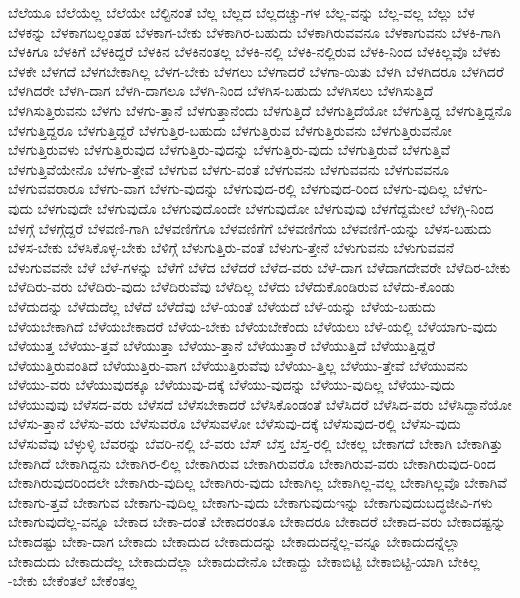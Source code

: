 {ಬೆಲೆಯೂ
ಬೆಲೆಯೆಲ್ಲ
ಬೆಲೆಯೇ
ಬೆಲ್ಟಿನಂತೆ
ಬೆಲ್ಲ
ಬೆಲ್ಲದ
ಬೆಲ್ಲದಚ್ಚು-ಗಳ
ಬೆಲ್ಲ-ವನ್ನು
ಬೆಲ್ಲ-ವಲ್ಲ
ಬೆಲ್ಲು
ಬೆಳ
ಬೆಳಕನ್ನು
ಬೆಳಕಾಗಬಲ್ಲಂತಹ
ಬೆಳಕಾಗ-ಬೇಕು
ಬೆಳಕಾಗಿರ-ಬಹುದು
ಬೆಳಕಾಗಿರುವವನೂ
ಬೆಳಕಾಗುವನು
ಬೆಳಕಿ-ಗಾಗಿ
ಬೆಳಕಿಗೂ
ಬೆಳಕಿಗೆ
ಬೆಳಕಿದ್ದರೆ
ಬೆಳಕಿನ
ಬೆಳಕಿನಂತಲ್ಲ
ಬೆಳಕಿ-ನಲ್ಲಿ
ಬೆಳಕಿ-ನಲ್ಲಿರುವ
ಬೆಳಕಿ-ನಿಂದ
ಬೆಳಕಿಲ್ಲವೊ
ಬೆಳಕು
ಬೆಳಕೇ
ಬೆಳಗದೆ
ಬೆಳಗಬೇಕಾಗಿಲ್ಲ
ಬೆಳಗ-ಬೇಕು
ಬೆಳಗಲು
ಬೆಳಗಾದರೆ
ಬೆಳಗಾ-ಯಿತು
ಬೆಳಗಿ
ಬೆಳಗಿದರೂ
ಬೆಳಗಿದರೆ
ಬೆಳಗಿದರೇ
ಬೆಳಗಿ-ದಾಗ
ಬೆಳಗಿ-ದಾಗಲೂ
ಬೆಳಗಿ-ನಿಂದ
ಬೆಳಗಿಸ-ಬಹುದು
ಬೆಳಗಿಸಲು
ಬೆಳಗಿಸುತ್ತಿದೆ
ಬೆಳಗಿಸುತ್ತಿರುವನು
ಬೆಳಗು
ಬೆಳಗು-ತ್ತಾನೆ
ಬೆಳಗುತ್ತಾನೆಂದು
ಬೆಳಗುತ್ತಿದೆ
ಬೆಳಗುತ್ತಿದೆಯೋ
ಬೆಳಗುತ್ತಿದ್ದ
ಬೆಳಗುತ್ತಿದ್ದನೊ
ಬೆಳಗುತ್ತಿದ್ದರೂ
ಬೆಳಗುತ್ತಿದ್ದರೆ
ಬೆಳಗುತ್ತಿರ-ಬಹುದು
ಬೆಳಗುತ್ತಿರುವ
ಬೆಳಗುತ್ತಿರುವನು
ಬೆಳಗುತ್ತಿರುವನೋ
ಬೆಳಗುತ್ತಿರುವಳು
ಬೆಳಗುತ್ತಿರುವುದ
ಬೆಳಗುತ್ತಿರು-ವುದನ್ನು
ಬೆಳಗುತ್ತಿರು-ವುದು
ಬೆಳಗುತ್ತಿರುವೆ
ಬೆಳಗುತ್ತಿವೆ
ಬೆಳಗುತ್ತಿವೆಯೇನೊ
ಬೆಳಗು-ತ್ತೇವೆ
ಬೆಳಗುವ
ಬೆಳಗು-ವಂತೆ
ಬೆಳಗುವನು
ಬೆಳಗುವವನು
ಬೆಳಗುವವನೂ
ಬೆಳಗುವವರಾರೂ
ಬೆಳಗು-ವಾಗ
ಬೆಳಗು-ವುದನ್ನು
ಬೆಳಗುವುದ-ರಲ್ಲಿ
ಬೆಳಗುವುದ-ರಿಂದ
ಬೆಳಗು-ವುದಿಲ್ಲ
ಬೆಳಗು-ವುದು
ಬೆಳಗುವುದೇ
ಬೆಳಗುವುದೊ
ಬೆಳಗುವುದೊಂದೇ
ಬೆಳಗುವುದೋ
ಬೆಳಗುವುವು
ಬೆಳಗೆದ್ದಮೇಲೆ
ಬೆಳಗ್ಗಿ-ನಿಂದ
ಬೆಳಗ್ಗೆ
ಬೆಳಗ್ಗೆದ್ದರೆ
ಬೆಳವಣಿ-ಗಾಗಿ
ಬೆಳವಣಿಗೆಗೂ
ಬೆಳವಣಿಗೆಗೆ
ಬೆಳವಣಿಗೆಯ
ಬೆಳವಣಿಗೆ-ಯನ್ನು
ಬೆಳಸ-ಬಹುದು
ಬೆಳಸ-ಬೇಕು
ಬೆಳಸಿಕೊಳ್ಳ-ಬೇಕು
ಬೆಳಿಗ್ಗೆ
ಬೆಳುಗುತ್ತಿರು-ವಂತೆ
ಬೆಳುಗು-ತ್ತೇನೆ
ಬೆಳುಗುವನು
ಬೆಳುಗುವವನೆ
ಬೆಳುಗುವವನೇ
ಬೆಳೆ
ಬೆಳೆ-ಗಳನ್ನು
ಬೆಳೆಗೆ
ಬೆಳೆದ
ಬೆಳೆದರೆ
ಬೆಳೆದ-ವರು
ಬೆಳೆ-ದಾಗ
ಬೆಳೆದಾಗದೇವರೇ
ಬೆಳೆದಿರ-ಬೇಕು
ಬೆಳೆದಿರು-ವರು
ಬೆಳೆದಿರು-ವುದು
ಬೆಳೆದಿರುವೆವು
ಬೆಳೆದಿಲ್ಲ
ಬೆಳೆದು
ಬೆಳೆದುಕೊಂಡಿರುವ
ಬೆಳೆದು-ಕೊಂಡು
ಬೆಳೆದುದನ್ನು
ಬೆಳೆದುದೆಲ್ಲ
ಬೆಳೆದೆ
ಬೆಳೆದೆವು
ಬೆಳೆ-ಯಂತೆ
ಬೆಳೆಯದೆ
ಬೆಳೆ-ಯನ್ನು
ಬೆಳೆಯ-ಬಹುದು
ಬೆಳೆಯಬೇಕಾಗಿದೆ
ಬೆಳೆಯಬೇಕಾದರೆ
ಬೆಳೆಯ-ಬೇಕು
ಬೆಳೆಯಬೇಕೆಂದು
ಬೆಳೆಯಲು
ಬೆಳೆ-ಯಲ್ಲಿ
ಬೆಳೆಯಾಗು-ವುದು
ಬೆಳೆಯುತ್ತ
ಬೆಳೆಯು-ತ್ತವೆ
ಬೆಳೆಯುತ್ತಾ
ಬೆಳೆಯು-ತ್ತಾನೆ
ಬೆಳೆಯುತ್ತಾರೆ
ಬೆಳೆಯುತ್ತಿದೆ
ಬೆಳೆಯುತ್ತಿದ್ದರೆ
ಬೆಳೆಯುತ್ತಿರುವಂತಿದೆ
ಬೆಳೆಯುತ್ತಿರು-ವಾಗ
ಬೆಳೆಯುತ್ತಿರುವೆವು
ಬೆಳೆಯು-ತ್ತಿಲ್ಲ
ಬೆಳೆಯು-ತ್ತೇವೆ
ಬೆಳೆಯುವನು
ಬೆಳೆಯು-ವರು
ಬೆಳೆಯುವುದಕ್ಕೂ
ಬೆಳೆಯುವು-ದಕ್ಕೆ
ಬೆಳೆಯು-ವುದನ್ನು
ಬೆಳೆಯು-ವುದಿಲ್ಲ
ಬೆಳೆಯು-ವುದು
ಬೆಳೆಯುವುವು
ಬೆಳೆಸದ-ವರು
ಬೆಳೆಸದೆ
ಬೆಳೆಸಬೇಕಾದರೆ
ಬೆಳೆಸಿಕೊಂಡಂತೆ
ಬೆಳೆಸಿದರೆ
ಬೆಳೆಸಿದ-ವರು
ಬೆಳೆಸಿದ್ದಾನೆಯೋ
ಬೆಳೆಸು-ತ್ತಾನೆ
ಬೆಳೆಸು-ವರು
ಬೆಳೆಸುವರೊ
ಬೆಳೆಸುವಳೋ
ಬೆಳೆಸುವು-ದಕ್ಕೆ
ಬೆಳೆಸುವುದ-ರಲ್ಲಿ
ಬೆಳೆಸು-ವುದು
ಬೆಳೆಸುವೆವು
ಬೆಳ್ಳುಳ್ಳಿ
ಬೆವರನ್ನು
ಬೆವರಿ-ನಲ್ಲಿ
ಬೆ-ವರು
ಬೆಸ್
ಬೆಸ್ತ
ಬೆಸ್ತ-ರಲ್ಲಿ
ಬೇಕಲ್ಲ
ಬೇಕಾಗದೆ
ಬೇಕಾಗಿ
ಬೇಕಾಗಿತ್ತು
ಬೇಕಾಗಿದೆ
ಬೇಕಾಗಿದ್ದನು
ಬೇಕಾಗಿರ-ಲಿಲ್ಲ
ಬೇಕಾಗಿರುವ
ಬೇಕಾಗಿರುವರೊ
ಬೇಕಾಗಿರುವ-ವರು
ಬೇಕಾಗಿರುವುದ-ರಿಂದ
ಬೇಕಾಗಿರುವುದರಿಂದಲೇ
ಬೇಕಾಗಿರು-ವುದಿಲ್ಲ
ಬೇಕಾಗಿರು-ವುದು
ಬೇಕಾಗಿಲ್ಲ
ಬೇಕಾಗಿಲ್ಲ-ವಲ್ಲ
ಬೇಕಾಗಿಲ್ಲವೊ
ಬೇಕಾಗಿವೆ
ಬೇಕಾಗು-ತ್ತವೆ
ಬೇಕಾಗುವ
ಬೇಕಾಗು-ವುದಿಲ್ಲ
ಬೇಕಾಗು-ವುದು
ಬೇಕಾಗುವುದುಇನ್ನು
ಬೇಕಾಗುವುದುಬದ್ಧಜೀವಿ-ಗಳು
ಬೇಕಾಗುವುದೆಲ್ಲ-ವನ್ನೂ
ಬೇಕಾದ
ಬೇಕಾ-ದಂತೆ
ಬೇಕಾದರಂತೂ
ಬೇಕಾದರೂ
ಬೇಕಾದರೆ
ಬೇಕಾದ-ವರು
ಬೇಕಾದಷ್ಟನ್ನು
ಬೇಕಾದಷ್ಟು
ಬೇಕಾ-ದಾಗ
ಬೇಕಾದು
ಬೇಕಾದುದ
ಬೇಕಾದುದನ್ನು
ಬೇಕಾದುದನ್ನೆಲ್ಲ-ವನ್ನೂ
ಬೇಕಾದುದನ್ನೆಲ್ಲಾ
ಬೇಕಾದುದು
ಬೇಕಾದುದೆಲ್ಲ
ಬೇಕಾದುದೆಲ್ಲಾ
ಬೇಕಾದುದೇನೊ
ಬೇಕಾದ್ದು
ಬೇಕಾಬಿಟ್ಟಿ
ಬೇಕಾಬಿಟ್ಟಿ-ಯಾಗಿ
ಬೇಕಿಲ್ಲ
-ಬೇಕು
ಬೇಕೆಂತಲೆ
ಬೇಕೆಂತಲ್ಲ
}
